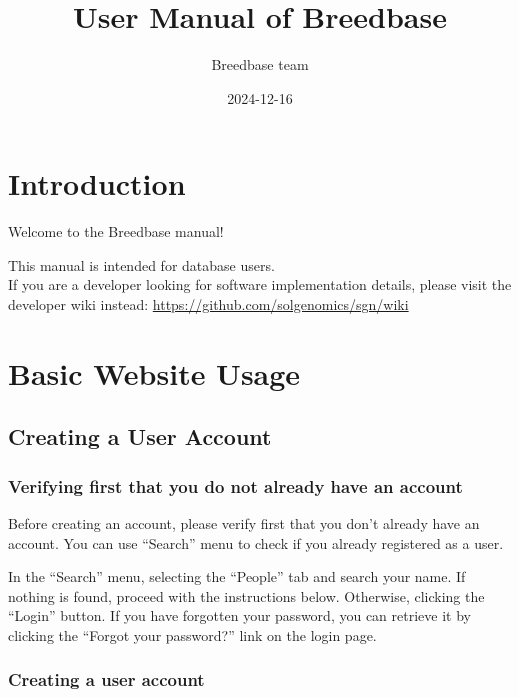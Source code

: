 \documentclass[
  12pt,
]{book}
\title{User Manual of Breedbase}
\author{Breedbase team}
\date{2024-12-16}
\begin{document}
\maketitle

{
\hypersetup{linkcolor=}
\setcounter{tocdepth}{2}
\tableofcontents
}
\hypertarget{introduction}{%
\chapter*{Introduction}\label{introduction}}


Welcome to the Breedbase manual!

This manual is intended for database users.\\
If you are a developer looking for software implementation details, please visit the developer wiki instead: \url{https://github.com/solgenomics/sgn/wiki}

\hypertarget{basic-website-usage}{%
\chapter{Basic Website Usage}\label{basic-website-usage}}

\hypertarget{creating-a-user-account}{%
\section{Creating a User Account}\label{creating-a-user-account}}

\hypertarget{verifying-first-that-you-do-not-already-have-an-account}{%
\subsection{Verifying first that you do not already have an account}\label{verifying-first-that-you-do-not-already-have-an-account}}

Before creating an account, please verify first that you don't already have an account. You can use ``Search'' menu to check if you already registered as a user.

In the ``Search'' menu, selecting the ``People'' tab and search your name. If nothing is found, proceed with the instructions below. Otherwise, clicking the ``Login'' button. If you have forgotten your password, you can retrieve it by clicking the ``Forgot your password?'' link on the login page.

\hypertarget{creating-a-user-account-1}{%
\subsection{Creating a user account}\label{creating-a-user-account-1}}
\end{document}
